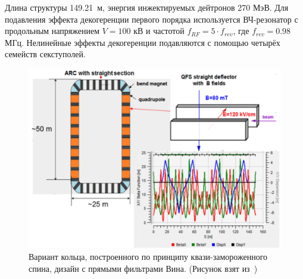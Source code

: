 Длина структуры 149.21~м, энергия инжектируемых дейтронов 270 МэВ. Для подавления эффекта декогеренции первого порядка используется ВЧ-резонатор с продольным напряжением $V = 100$ кВ и частотой $f_{RF} = 5\cdot f_{rev}$, где $f_{rev} = 0.98$ МГц. Нелинейные эффекты декогеренции подавляются с помощью четырёх семейств секступолей.
\begin{figure}[h!]
	\centering
	\includegraphics[width=\linewidth]{images/chapter2/E+B_lattice}
	\caption{Вариант кольца, построенного по принципу квази-замороженного спина, дизайн с прямыми фильтрами Вина. (Рисунок взят из~\cite{Senichev:Lattices})\label{fig:QFS_E+B_lattice}}
\end{figure}

